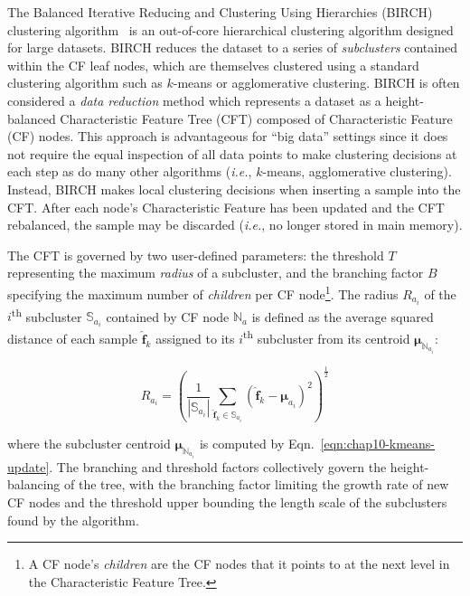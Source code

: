 The Balanced Iterative Reducing and Clustering Using Hierarchies (BIRCH) clustering algorithm~\cite{zhang1996birch} is an out-of-core hierarchical clustering algorithm designed for large datasets.
BIRCH reduces the dataset to a series of \textit{subclusters} contained within the CF leaf nodes, which are themselves clustered using a standard clustering algorithm such as $k$-means or agglomerative clustering.
BIRCH is often considered a \textit{data reduction} method which represents a dataset as a height-balanced Characteristic Feature Tree (CFT) composed of Characteristic Feature (CF) nodes. This approach is advantageous for ``big data'' settings since it does not require the equal inspection of all data points to make clustering decisions at each step as do many other algorithms (\textit{i.e.}, $k$-means, agglomerative clustering). Instead, BIRCH makes local clustering decisions when inserting a sample into the CFT. After each node's Characteristic Feature has been updated and the CFT rebalanced, the sample may be discarded (\textit{i.e.}, no longer stored in main memory). 

The CFT is governed by two user-defined parameters: the threshold $T$ representing the maximum \textit{radius} of a subcluster, and the branching factor $B$ specifying the maximum number of \textit{children} per CF node\footnote{A CF node's \textit{children} are the CF nodes that it points to at the next level in the Characteristic Feature Tree.}. The radius $R_{a_{i}}$ of the $i$\textsuperscript{th} subcluster $\mathbb{S}_{a_{i}}$ contained by CF node $\mathbb{N}_{a}$ is defined as the average squared distance of each sample $\boldsymbol{\hat{f}}_{k}$ assigned to its $i$\textsuperscript{th} subcluster from its centroid $\boldsymbol{\mu}_{\mathbb{N}_{a_{i}}}$:

\begin{equation}
\label{eqn:chap10-birch-radius}
R_{a_{i}} = \left(\frac{1}{|\mathbb{S}_{a_{i}}|}\displaystyle\sum\limits_{\boldsymbol{\hat{f}}_{k} \in \mathbb{S}_{a_{i}}} \left(\boldsymbol{\hat{f}}_{k} - \boldsymbol{\mu}_{a_{i}}\right)^{2}\right)^{\frac{1}{2}}
\end{equation}

\noindent where the subcluster centroid $\boldsymbol{\mu}_{\mathbb{N}_{a_{i}}}$ is computed by Eqn.~\ref{eqn:chap10-kmeans-update}. The branching and threshold factors collectively govern the height-balancing of the tree, with the branching factor limiting the growth rate of new CF nodes and the threshold upper bounding the length scale of the subclusters found by the algorithm. 

